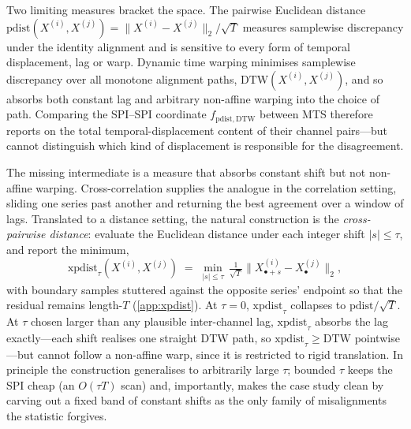 \documentclass{article}
\theoremstyle{plain}
\theoremstyle{definition}
\theoremstyle{remark}
\begin{document}
Two limiting measures bracket the space. The pairwise Euclidean distance $\mathrm{pdist}(X^{(i)},X^{(j)}) = \|X^{(i)} - X^{(j)}\|_2 / \sqrt{T}$ measures samplewise discrepancy under the identity alignment and is sensitive to every form of temporal displacement, lag or warp. Dynamic time warping \citep{sakoe1978dynamic} minimises samplewise discrepancy over all monotone alignment paths, $\mathrm{DTW}(X^{(i)},X^{(j)})$, and so absorbs both constant lag and arbitrary non-affine warping into the choice of path. Comparing the SPI--SPI coordinate $f_{\mathrm{pdist},\mathrm{DTW}}$ between MTS therefore reports on the total temporal-displacement content of their channel pairs---but cannot distinguish which kind of displacement is responsible for the disagreement.

The missing intermediate is a measure that absorbs constant shift but not non-affine warping. Cross-correlation supplies the analogue in the correlation setting, sliding one series past another and returning the best agreement over a window of lags. Translated to a distance setting, the natural construction is the \emph{cross-pairwise distance}: evaluate the Euclidean distance under each integer shift $|s| \le \tau$, and report the minimum,
\begin{equation}
\label{eq:xpdist}
\mathrm{xpdist}_\tau(X^{(i)},X^{(j)}) \;=\; \min_{|s|\le\tau}\, \tfrac{1}{\sqrt{T}}\bigl\|X^{(i)}_{\bullet+s} - X^{(j)}_{\bullet}\bigr\|_2,
\end{equation}
with boundary samples stuttered against the opposite series' endpoint so that the residual remains length-$T$ (\cref{app:xpdist}). At $\tau=0$, $\mathrm{xpdist}_\tau$ collapses to $\mathrm{pdist}/\sqrt{T}$. At $\tau$ chosen larger than any plausible inter-channel lag, $\mathrm{xpdist}_\tau$ absorbs the lag exactly---each shift realises one straight DTW path, so $\mathrm{xpdist}_\tau \ge \mathrm{DTW}$ pointwise---but cannot follow a non-affine warp, since it is restricted to rigid translation. In principle the construction generalises to arbitrarily large $\tau$; bounded $\tau$ keeps the SPI cheap (an $O(\tau T)$ scan) and, importantly, makes the case study clean by carving out a fixed band of constant shifts as the only family of misalignments the statistic forgives.
\end{document}
